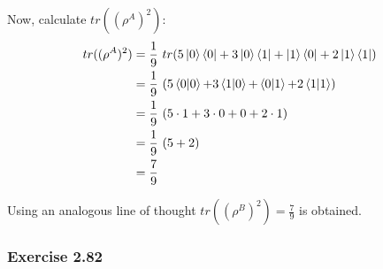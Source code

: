 Now, calculate $tr((\rho^A)^2)$:
\begin{align}
    tr((\rho^A)^2) &= \frac{1}{9}\ tr(5\ket{0}\bra{0} + 3\ket{0}\bra{1} +
        \ket{1}\bra{0} + 2\ket{1}\bra{1}) \\
    &= \frac{1}{9}\ (5\mathop{\mathinner{ \langle{0}|{0}\rangle}} + 3\mathop{\mathinner{ \langle{1}|{0}\rangle}} +
        \mathop{\mathinner{ \langle{0}|{1}\rangle}} + 2\mathop{\mathinner{ \langle{1}|{1}\rangle}}) \\
    &= \frac{1}{9}\ (5 \cdot 1 + 3 \cdot 0 + 0 + 2 \cdot 1) \\
    &= \frac{1}{9}\ (5 + 2) \\
    &= \frac{7}{9}
\end{align}

Using an analogous line of thought $tr((\rho^B)^2) = \frac{7}{9}$ is obtained.

\subsubsection{Exercise 2.82}

